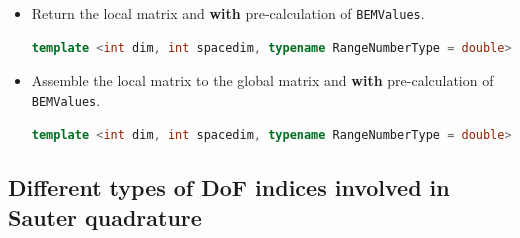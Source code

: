 \documentclass[11pt, a4paper]{article}
\begin{document}
\begin{itemize}
\begin{itemize}
\begin{lstlisting}[language=C++]
    \end{lstlisting}
  \item Return the local matrix and \textbf{with} pre-calculation of \texttt{BEMValues}.
    \begin{lstlisting}[language=C++]
      template <int dim, int spacedim, typename RangeNumberType = double> FullMatrix<RangeNumberType> SauterQuadRule( const LaplaceKernel::KernelFunction<spacedim, RangeNumberType> & kernel_function, const BEMValues<dim, spacedim> & bem_values, const typename DoFHandler<dim, spacedim>::cell_iterator &kx_cell_iter, const typename DoFHandler<dim, spacedim>::cell_iterator &ky_cell_iter, const MappingQGeneric<dim, spacedim> & kx_mapping = MappingQGeneric<dim, spacedim>(1), const MappingQGeneric<dim, spacedim> &ky_mapping = MappingQGeneric<dim, spacedim>(1))
    \end{lstlisting}
  \item Assemble the local matrix to the global matrix and \textbf{with} pre-calculation of
    \texttt{BEMValues}.
    \begin{lstlisting}[language=C++]
      template <int dim, int spacedim, typename RangeNumberType = double> void SauterQuadRule( FullMatrix<RangeNumberType> &system_matrix, const LaplaceKernel::KernelFunction<spacedim, RangeNumberType> & kernel_function, const BEMValues<dim, spacedim> & bem_values, const typename DoFHandler<dim, spacedim>::cell_iterator &kx_cell_iter, const typename DoFHandler<dim, spacedim>::cell_iterator &ky_cell_iter, const MappingQGeneric<dim, spacedim> & kx_mapping = MappingQGeneric<dim, spacedim>(1), const MappingQGeneric<dim, spacedim> &ky_mapping = MappingQGeneric<dim, spacedim>(1))
    \end{lstlisting}
  \end{itemize}
\end{itemize}

\subsection{Different types of DoF indices involved in Sauter quadrature}
\end{document}
